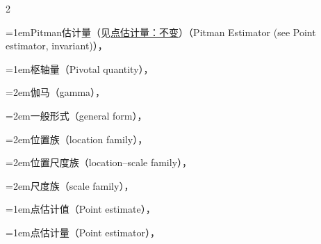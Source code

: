 \begin{multicols}{2}
\par\addvspace{2pt}
\par\noindent\hangindent=1em\hspace*{0em}\label{idx:755}Pitman估计量（见\hyperref[idx:787]{点估计量：不变}）（Pitman Estimator (see Point estimator, invariant)），\hyperref[exercise:7.35]{\pageref*{exercise:7.35}}\par
\par\addvspace{2pt}
\par\noindent\hangindent=1em\hspace*{0em}\label{idx:756}枢轴量（Pivotal quantity），\hyperref[def:9.2.6]{\pageref*{def:9.2.6}}\par
\par\noindent\hangindent=2em\hspace*{1em}\label{idx:757}伽马（gamma），\hyperref[ex:9.2.8]{\pageref*{ex:9.2.8}}\par
\par\noindent\hangindent=2em\hspace*{1em}\label{idx:758}一般形式（general form），\hyperref[eq:9.2.11]{\pageref*{eq:9.2.11}}\par
\par\noindent\hangindent=2em\hspace*{1em}\label{idx:759}位置族（location family），\hyperref[ex:9.2.7]{\pageref*{ex:9.2.7}}\par
\par\noindent\hangindent=2em\hspace*{1em}\label{idx:760}位置尺度族（location–scale family），\hyperref[ex:9.2.7]{\pageref*{ex:9.2.7}}\par
\par\noindent\hangindent=2em\hspace*{1em}\label{idx:761}尺度族（scale family），\hyperref[ex:9.2.7]{\pageref*{ex:9.2.7}}\par
\par\addvspace{2pt}
\par\noindent\hangindent=1em\hspace*{0em}\label{idx:762}点估计值（Point estimate），\hyperref[idxocc:762:283]{\pageref*{idxocc:762:283}}\par
\par\addvspace{2pt}
\par\noindent\hangindent=1em\hspace*{0em}\label{idx:763}点估计量（Point estimator），\hyperref[def:7.1.1]{\pageref*{def:7.1.1}}\par

\end{multicols}
